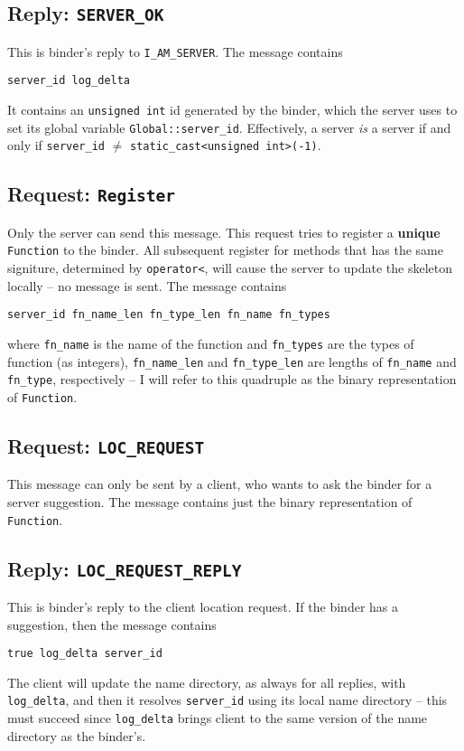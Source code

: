 \subsection{Reply: \tt SERVER\_OK}
This is binder's reply to {\tt I\_AM\_SERVER}.
The message contains
\begin{verbatim}
server_id log_delta
\end{verbatim}
It contains an {\tt unsigned int} id generated by the binder, which the server uses to set its global variable {\tt Global::server\_id}.
Effectively, a server \emph{is} a server if and only if {\tt server\_id} $\neq$ {\tt static\_cast<unsigned int>(-1)}.

\subsection{Request: \tt Register}
Only the server can send this message.
This request tries to register a {\bf unique} {\tt Function} to the binder.
All subsequent register for methods that has the same signiture, determined by {\tt operator<}, will cause the server to update the skeleton locally -- no message is sent.
The message contains
\begin{verbatim}
server_id fn_name_len fn_type_len fn_name fn_types
\end{verbatim}
where {\tt fn\_name} is the name of the function and {\tt fn\_types} are the types of function (as integers), {\tt fn\_name\_len} and {\tt fn\_type\_len} are lengths of {\tt fn\_name} and {\tt fn\_type}, respectively -- I will refer to this quadruple as the binary representation of {\tt Function}.

\subsection{Request: \tt LOC\_REQUEST}
This message can only be sent by a client, who wants to ask the binder for a server suggestion.
The message contains just the binary representation of {\tt Function}.

\subsection{Reply: \tt LOC\_REQUEST\_REPLY}
This is binder's reply to the client location request.
If the binder has a suggestion, then the message contains
\begin{verbatim}
true log_delta server_id
\end{verbatim}
The client will update the name directory, as always for all replies, with {\tt log\_delta}, and then it resolves {\tt server\_id} using its local name directory -- this must succeed since {\tt log\_delta} brings client to the same version of the name directory as the binder's.

